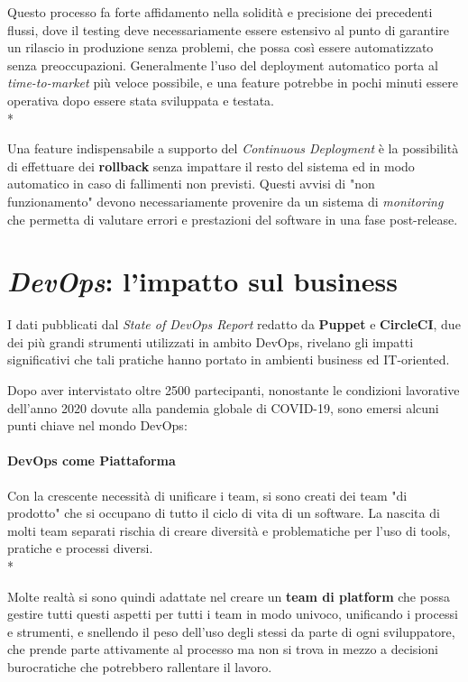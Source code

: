\documentclass[../main.tex]{subfiles}
\begin{document}
        			Questo processo fa forte affidamento nella solidità e precisione dei precedenti flussi, dove il testing deve necessariamente essere estensivo al punto di garantire un rilascio in produzione senza problemi, che possa così essere automatizzato senza preoccupazioni. Generalmente l'uso del deployment automatico porta al \emph{time-to-market} più veloce possibile, e una feature potrebbe in pochi minuti essere operativa dopo essere stata sviluppata e testata.\\*
        			
        			Una feature indispensabile a supporto del \emph{Continuous Deployment} è la possibilità di effettuare dei \textbf{rollback} senza impattare il resto del sistema ed in modo automatico in caso di fallimenti non previsti. Questi avvisi di "non funzionamento" devono necessariamente provenire da un sistema di \emph{monitoring} che permetta di valutare errori e prestazioni del software in una fase post-release.
        			
        \section{\emph{DevOps}: l'impatto sul business}
            
            I dati pubblicati dal \emph{State of DevOps Report}\cite{state_of_devops_report_2020} redatto da \textbf{Puppet} e \textbf{CircleCI}, due dei più grandi strumenti utilizzati in ambito DevOps, rivelano gli impatti significativi che tali pratiche hanno portato in ambienti business ed IT-oriented.
            
            Dopo aver intervistato oltre 2500 partecipanti, nonostante le condizioni lavorative dell'anno 2020 dovute alla pandemia globale di COVID-19, sono emersi alcuni punti chiave nel mondo DevOps:
            
            \paragraph{DevOps come Piattaforma}
            Con la crescente necessità di unificare i team, si sono creati dei team "di prodotto" che si occupano di tutto il ciclo di vita di un software. La nascita di molti team separati rischia di creare diversità e problematiche per l'uso di tools, pratiche e processi diversi.\\*
            
            Molte realtà si sono quindi adattate nel creare un \textbf{team di platform} che possa gestire tutti questi aspetti per tutti i team in modo univoco, unificando i processi e strumenti, e snellendo il peso dell'uso degli stessi da parte di ogni sviluppatore, che prende parte attivamente al processo ma non si trova in mezzo a decisioni burocratiche che potrebbero rallentare il lavoro.
            
\end{document}
